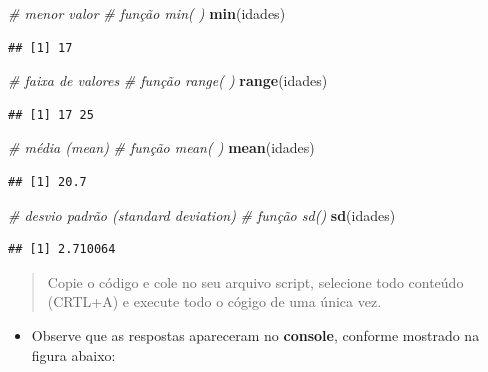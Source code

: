 \documentclass[
]{book}
\newenvironment{Shaded}{\begin{snugshade}}{\end{snugshade}}
\newcommand{\CommentTok}[1]{\textcolor[rgb]{0.56,0.35,0.01}{\textit{#1}}}
\newcommand{\FunctionTok}[1]{\textcolor[rgb]{0.13,0.29,0.53}{\textbf{#1}}}
\newcommand{\NormalTok}[1]{#1}
\providecommand{\tightlist}{%
  \setlength{\itemsep}{0pt}\setlength{\parskip}{0pt}}
\begin{document}
\begin{Shaded}
\begin{Highlighting}[]
\CommentTok{\# menor valor}
\CommentTok{\# função min( )}
\FunctionTok{min}\NormalTok{(idades)}
\end{Highlighting}
\end{Shaded}

\begin{verbatim}
## [1] 17
\end{verbatim}

\begin{Shaded}
\begin{Highlighting}[]
\CommentTok{\# faixa de valores}
\CommentTok{\# função range( )}
\FunctionTok{range}\NormalTok{(idades)}
\end{Highlighting}
\end{Shaded}

\begin{verbatim}
## [1] 17 25
\end{verbatim}

\begin{Shaded}
\begin{Highlighting}[]
\CommentTok{\# média (mean)}
\CommentTok{\# função mean( )}
\FunctionTok{mean}\NormalTok{(idades)}
\end{Highlighting}
\end{Shaded}

\begin{verbatim}
## [1] 20.7
\end{verbatim}

\begin{Shaded}
\begin{Highlighting}[]
\CommentTok{\# desvio padrão (standard deviation)}
\CommentTok{\# função sd() }
\FunctionTok{sd}\NormalTok{(idades)}
\end{Highlighting}
\end{Shaded}

\begin{verbatim}
## [1] 2.710064
\end{verbatim}

\begin{quote}
Copie o código e cole no seu arquivo script, selecione todo conteúdo (CRTL+A) e execute todo o cógigo de uma única vez.
\end{quote}

\begin{itemize}
\tightlist
\item
  Observe que as respostas apareceram no \textbf{console}, conforme mostrado na figura abaixo:
\end{itemize}
\end{document}
